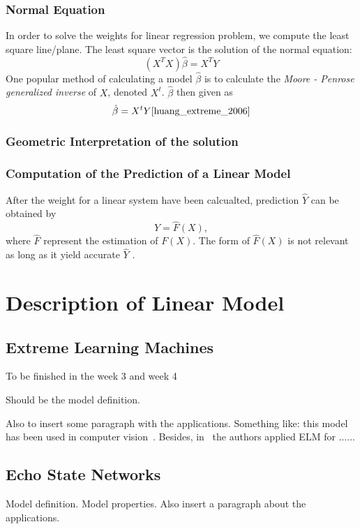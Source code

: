 \documentclass[11pt]{article}
\newcommand{\msb}[1]{{\color{blue}#1}}
\begin{document}
\subsubsection{Normal Equation}
In order to solve the weights for linear regression problem, we compute the least square line/plane. The least square vector is the solution of the normal equation:
\begin{equation*}
(X^TX)\hat{\beta} = X^TY
\end{equation*}
One popular method of calculating a model $\hat{\beta}$ is to calculate the\emph{ Moore - Penrose generalized inverse} of $X$, denoted $X^t$. $\hat{\beta}$ then given as
\begin{equation*}
\hat{\beta} = X^tY \cite{huang_extreme_2006}
\end{equation*}
\subsubsection{Geometric Interpretation of the solution}

\subsubsection{Computation of the Prediction of a Linear Model}
After the weight for a linear system have been calcualted, prediction $\hat{Y}$ can be obtained by
\begin{equation*}
\hat{Y} = \hat{F}(X),
\end{equation*}
where $\hat{F}$ represent the estimation of $F(X)$. The form of $\hat{F}(X)$ is not relevant as long as it yield accurate $\hat{Y}$ \cite [p. 19] {james_introduction_2013}.
\section{Description of Linear Model}

\subsection{Extreme Learning Machines}
\msb{To be finished in the week 3 and week 4}

Should be the model definition.

Also to insert some paragraph with the applications. Something like: this model has been used in computer vision~\cite{.....}. Besides, in~\cite{} the authors applied ELM for ......

\subsection{Echo State Networks}
Model definition.
Model properties.
Also insert a paragraph about the applications.
\end{document}
